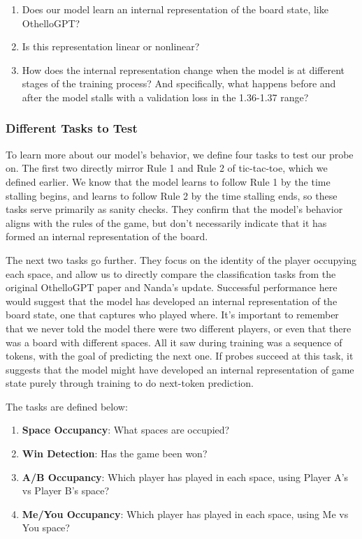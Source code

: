 \documentclass[11pt]{article}
\providecommand{\tightlist}{%
      \setlength{\itemsep}{0pt}\setlength{\parskip}{0pt}}
\begin{document}
\begin{enumerate}
\def\labelenumi{\arabic{enumi}.}
\tightlist
\item
  Does our model learn an internal representation of the board state,
  like OthelloGPT?
\item
  Is this representation linear or nonlinear?
\item
  How does the internal representation change when the model is at
  different stages of the training process? And specifically, what
  happens before and after the model stalls with a validation loss in
  the 1.36-1.37 range?
\end{enumerate}

\subsubsection{Different Tasks to Test}\label{different-tasks-to-test}

To learn more about our model's behavior, we define four tasks to test
our probe on. The first two directly mirror Rule 1 and Rule 2 of
tic-tac-toe, which we defined earlier. We know that the model learns to
follow Rule 1 by the time stalling begins, and learns to follow Rule 2
by the time stalling ends, so these tasks serve primarily as sanity
checks. They confirm that the model's behavior aligns with the rules of
the game, but don't necessarily indicate that it has formed an internal
representation of the board.

The next two tasks go further. They focus on the identity of the player
occupying each space, and allow us to directly compare the
classification tasks from the original OthelloGPT paper and Nanda's
update. Successful performance here would suggest that the model has
developed an internal representation of the board state, one that
captures who played where. It's important to remember that we never told
the model there were two different players, or even that there was a
board with different spaces. All it saw during training was a sequence of
tokens, with the goal of predicting the next one. If probes succeed at
this task, it suggests that the model might have developed an internal
representation of game state purely through training to do next-token
prediction.

The tasks are defined below:

\begin{enumerate}
\def\labelenumi{\arabic{enumi}.}
\tightlist
\item
  \textbf{Space Occupancy}: What spaces are occupied?
\item
  \textbf{Win Detection}: Has the game been won?
\item
  \textbf{A/B Occupancy}: Which player has played in each space, using
  Player A's vs Player B's space?
\item
  \textbf{Me/You Occupancy}: Which player has played in each space,
  using Me vs You space?
\end{enumerate}
\end{document}
